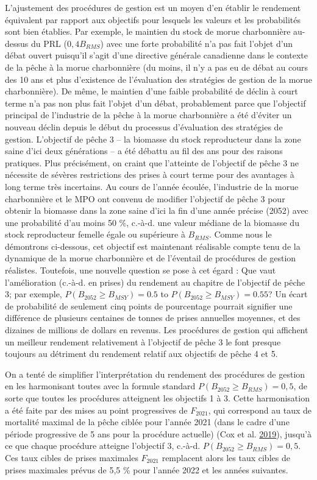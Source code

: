 \documentclass[11pt]{book}
\begin{document}
L'ajustement des procédures de gestion est un moyen d'en établir le rendement équivalent par rapport aux objectifs pour lesquels les valeurs et les probabilités sont bien établies. Par exemple, le maintien du stock de morue charbonnière au-dessus du PRL (\(0,4B_{RMS}\)) avec une forte probabilité n'a pas fait l'objet d'un débat ouvert puisqu'il s'agit d'une directive générale canadienne dans le contexte de la pêche à la morue charbonnière (du moins, il n'y a pas eu de débat au cours des 10 ans et plus d'existence de l'évaluation des stratégies de gestion de la morue charbonnière). De même, le maintien d'une faible probabilité de déclin à court terme n'a pas non plus fait l'objet d'un débat, probablement parce que l'objectif principal de l'industrie de la pêche à la morue charbonnière a été d'éviter un nouveau déclin depuis le début du processus d'évaluation des stratégies de gestion. L'objectif de pêche 3 -- la biomasse du stock reproducteur dans la zone saine d'ici deux générations -- a été débattu au fil des ans pour des raisons pratiques. Plus précisément, on craint que l'atteinte de l'objectif de pêche 3 ne nécessite de sévères restrictions des prises à court terme pour des avantages à long terme très incertains. Au cours de l'année écoulée, l'industrie de la morue charbonnière et le MPO ont convenu de modifier l'objectif de pêche 3 pour obtenir la biomasse dans la zone saine d'ici la fin d'une année précise (2052) avec une probabilité d'au moins 50 \%, c.-à-d. une valeur médiane de la biomasse du stock reproducteur femelle égale ou supérieure à \(B_{RMS}\). Comme nous le démontrons ci-dessous, cet objectif est maintenant réalisable compte tenu de la dynamique de la morue charbonnière et de l'éventail de procédures de gestion réalistes. Toutefois, une nouvelle question se pose à cet égard : Que vaut l'amélioration (c.-à-d. en prises) du rendement au chapitre de l'objectif de pêche 3; par exemple, \(P(B_{2052} \geq B_{MSY}) = 0.5\) to \(P(B_{2052} \geq B_{MSY}) = 0.55\)? Un écart de probabilité de seulement cinq points de pourcentage pourrait signifier une différence de plusieurs centaines de tonnes de prises annuelles moyennes, et des dizaines de millions de dollars en revenus. Les procédures de gestion qui affichent un meilleur rendement relativement à l'objectif de pêche 3 le font presque toujours au détriment du rendement relatif aux objectifs de pêche 4 et 5.

On a tenté de simplifier l'interprétation du rendement des procédures de gestion en les harmonisant toutes avec la formule standard \(P(B_{2052} \geq B_{RMS}) = 0,5\), de sorte que toutes les procédures atteignent les objectifs 1 à 3. Cette harmonisation a été faite par des mises au point progressives de \(F_{2021}\), qui correspond au taux de mortalité maximal de la pêche ciblée pour l'année 2021 (dans le cadre d'une période progressive de 5 ans pour la procédure actuelle) (Cox et al. \protect\hyperlink{ref-cox2019evaluating}{2019}), jusqu'à ce que chaque procédure atteigne l'objectif 3, c.-à-d. \(P(B_{2052} \geq B_{RMS}) = 0,5\). Ces taux cibles de prises maximales \(F_{2021}\) remplacent alors les taux cibles de prises maximales prévus de 5,5 \% pour l'année 2022 et les années suivantes.
\end{document}
